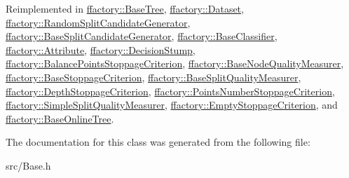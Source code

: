 Reimplemented in \hyperlink{classffactory_1_1_base_tree_a21d7faa1c68bb531522a73c36b10a95c}{ffactory\-::\-Base\-Tree}, \hyperlink{classffactory_1_1_dataset_a3017145c5f83813b81918aa0b2a9679b}{ffactory\-::\-Dataset}, \hyperlink{classffactory_1_1_random_split_candidate_generator_ab5ec1be9458ea7f7626f47bce9754bd6}{ffactory\-::\-Random\-Split\-Candidate\-Generator}, \hyperlink{classffactory_1_1_base_split_candidate_generator_a9247b20b96b60d227f3f3484e5614f39}{ffactory\-::\-Base\-Split\-Candidate\-Generator}, \hyperlink{classffactory_1_1_base_classifier_af6b0a89fd34ba70626104500d612d836}{ffactory\-::\-Base\-Classifier}, \hyperlink{classffactory_1_1_attribute_ad5494e94be89e79cefbbc40de865c970}{ffactory\-::\-Attribute}, \hyperlink{classffactory_1_1_decision_stump_af2c5492cfe13d297b11a7aa491695998}{ffactory\-::\-Decision\-Stump}, \hyperlink{classffactory_1_1_balance_points_stoppage_criterion_ae5414001f1c98a7fccf961a5015b3aa5}{ffactory\-::\-Balance\-Points\-Stoppage\-Criterion}, \hyperlink{classffactory_1_1_base_node_quality_measurer_a7d93ff368d8b2b439c0f7310213bf63f}{ffactory\-::\-Base\-Node\-Quality\-Measurer}, \hyperlink{classffactory_1_1_base_stoppage_criterion_a0543f9c748cb8092e08314a8d2d40c79}{ffactory\-::\-Base\-Stoppage\-Criterion}, \hyperlink{classffactory_1_1_base_split_quality_measurer_a0bd98e9b10ef01211e0839e9a6f22d26}{ffactory\-::\-Base\-Split\-Quality\-Measurer}, \hyperlink{classffactory_1_1_depth_stoppage_criterion_aeb81f88755a7dbae93a176ce8cee5624}{ffactory\-::\-Depth\-Stoppage\-Criterion}, \hyperlink{classffactory_1_1_points_number_stoppage_criterion_af8eaa4b922862c103528d9326115c74f}{ffactory\-::\-Points\-Number\-Stoppage\-Criterion}, \hyperlink{classffactory_1_1_simple_split_quality_measurer_a2d35a560f2ba91a6be600c8d42f3332e}{ffactory\-::\-Simple\-Split\-Quality\-Measurer}, \hyperlink{classffactory_1_1_empty_stoppage_criterion_a19181caac08aad7d05fcc07307c93c70}{ffactory\-::\-Empty\-Stoppage\-Criterion}, and \hyperlink{classffactory_1_1_base_online_tree_ad814d53893b7321f3384677b864ba2de}{ffactory\-::\-Base\-Online\-Tree}.



The documentation for this class was generated from the following file\-:\begin{DoxyCompactItemize}
\item 
src/Base.\-h\end{DoxyCompactItemize}

